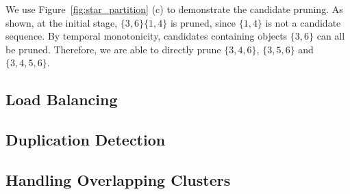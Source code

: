 \begin{example}
We use Figure~\ref{fig:star_partition} (c) to demonstrate the candidate pruning. As shown, at the initial stage, $\{3,6\}\{1,4\}$ is pruned, since $\{1,4\}$ is not a candidate sequence. By temporal monotonicity, candidates containing objects $\{3,6\}$ can all be pruned. Therefore, we are able to directly prune $\{3,4,6\}$, $\{3,5,6\}$ and $\{3,4,5,6\}$.
\end{example}
%
\subsection{Load Balancing}

\subsection{Duplication Detection}

\subsection{Handling Overlapping Clusters}